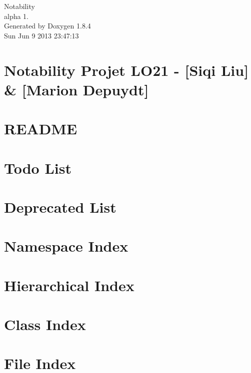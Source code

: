 \documentclass[twoside]{book}
\newcommand{\clearemptydoublepage}{%
  \newpage{\pagestyle{empty}\cleardoublepage}%
}
\begin{document}
\hypersetup{pageanchor=false}
\begin{titlepage}
\vspace*{7cm}
\begin{center}%
{\Large Notability \\[1ex]\large alpha 1. }\\
\vspace*{1cm}
{\large Generated by Doxygen 1.8.4}\\
\vspace*{0.5cm}
{\small Sun Jun 9 2013 23:47:13}\\
\end{center}
\end{titlepage}
\clearemptydoublepage
\tableofcontents
\clearemptydoublepage
{}
\hypersetup{pageanchor=true}

\chapter{Notability Projet L\-O21 -\/ \mbox{[}Siqi Liu\mbox{]} \& \mbox{[}Marion Depuydt\mbox{]}}
\label{index}\hypertarget{index}{}
\chapter{R\-E\-A\-D\-M\-E}
\label{md_README}
\hypertarget{md_README}{}

\chapter{Todo List}
\label{todo}
\hypertarget{todo}{}

\chapter{Deprecated List}
\label{deprecated}
\hypertarget{deprecated}{}

\chapter{Namespace Index}

\chapter{Hierarchical Index}

\chapter{Class Index}

\chapter{File Index}

\end{document}
